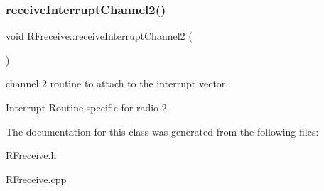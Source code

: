 \subsubsection{\texorpdfstring{receive\+Interrupt\+Channel2()}{receiveInterruptChannel2()}}
{\footnotesize\ttfamily void R\+Freceive\+::receive\+Interrupt\+Channel2 (\begin{DoxyParamCaption}{ }\end{DoxyParamCaption})\hspace{0.3cm}{\ttfamily [static]}}



channel 2 routine to attach to the interrupt vector 

Interrupt Routine specific for radio 2. 

The documentation for this class was generated from the following files\+:\begin{DoxyCompactItemize}
\item 
R\+Freceive.\+h\item 
R\+Freceive.\+cpp\end{DoxyCompactItemize}
